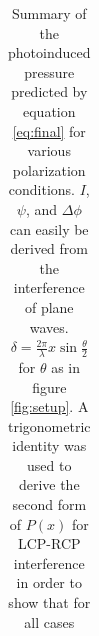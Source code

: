 \documentclass[aps, prl, twocolumn, groupedaddress]{revtex4-1}
\begin{document}
\begin{table}
\begin{ruledtabular}
\begin{tabular}{l c c c r}
                                                                                                                                                                                                                                                                                                                                                                                                                                                                                                                                \end{tabular}
  \end{ruledtabular}
  \caption{Summary of the photoinduced pressure predicted by equation \ref{eq:final} for
                                                                                                                                                                                                                                                                                                                                                                                                                                                                                                                                various polarization conditions. $I$, $\psi$, and $\Delta\phi$ can easily be derived from
                                                                                                                                                                                                                                                                                                                                                                                                                                                                                                                                the interference of plane waves. $\delta=\frac{2\pi}{\lambda} x\sin\frac{\theta}{2}$ for
                                                                                                                                                                                                                                                                                                                                                                                                                                                                                                                                $\theta$ as in figure \ref{fig:setup}. A trigonometric identity was used to derive the
                                                                                                                                                                                                                                                                                                                                                                                                                                                                                                                                second form of $P(x)$ for LCP-RCP interference in order to show that for all cases
}
\end{table}
\end{document}

